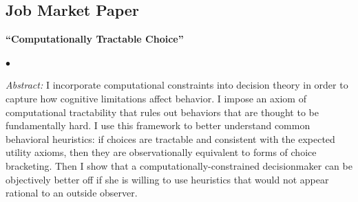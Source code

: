 \documentclass[margin,line]{res}
\newenvironment{list1}{
  \begin{list}{\ding{113}}{%
      \setlength{\itemsep}{.025in}
      \setlength{\parsep}{0in} \setlength{\parskip}{0in}
      \setlength{\topsep}{0in} \setlength{\partopsep}{0in}
      \setlength{\leftmargin}{0.17in}}}{\end{list}}
\newenvironment{list2}{
  \begin{list}{$\bullet$}{%
      \setlength{\itemsep}{0in}
      \setlength{\parsep}{0in} \setlength{\parskip}{0in}
      \setlength{\topsep}{0in} \setlength{\partopsep}{0in}
      \setlength{\leftmargin}{0.2in}}}{\end{list}}
\begin{document}
\begin{resume}
\section{Job Market Paper}
\begin{list1}
\item[] \textbf{``Computationally Tractable Choice''}
\vspace*{.05in}
	\begin{list2}
		\item[] \textit{Abstract:} 
		I incorporate computational constraints into decision theory in order to capture how cognitive limitations affect behavior.
		I impose an axiom of computational tractability that rules out behaviors that are thought to be fundamentally hard. 
		I use this framework to better understand common behavioral heuristics: if choices are tractable and consistent with the expected utility axioms, then they are observationally equivalent to forms of choice bracketing.
		Then I show that a computationally-constrained decisionmaker can be objectively better off if she is willing to use heuristics that would not appear rational to an outside observer.
	\end{list2}
\end{list1}


\end{resume}
\end{document}
